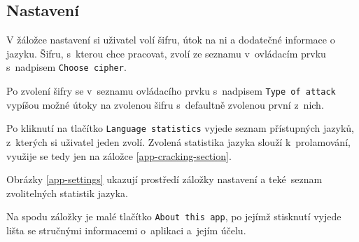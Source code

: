 \documentclass[glossaries, index]{kidiplom}
\begin{document}
\subsection{Nastavení}
\label{app-settings-section}
V žáložce nastavení si uživatel volí šifru, útok na ni a dodatečné informace o jazyku. Šifru, s~kterou chce pracovat, zvolí ze seznamu v~ovládacím prvku s~nadpisem \texttt{Choose cipher}. 

Po zvolení šifry se v~seznamu ovládacího prvku s~nadpisem \texttt{Type of attack} vypíšou možné útoky na zvolenou šifru s~defaultně zvolenou první z~nich.

Po kliknutí na tlačítko \texttt{Language statistics} vyjede seznam přístupných jazyků, z~kterých si uživatel jeden zvolí. Zvolená statistika jazyka slouží k~prolamování, využije se tedy jen na záložce \ref{app-cracking-section}.

Obrázky \ref{app-settings} ukazují prostředí záložky nastavení a teké~seznam zvolitelných statistik jazyka.

Na spodu záložky je malé tlačítko \texttt{About this app}, po jejímž stisknutí vyjede lišta se stručnými informacemi o~aplikaci a~jejím účelu.
\\
\end{document}
